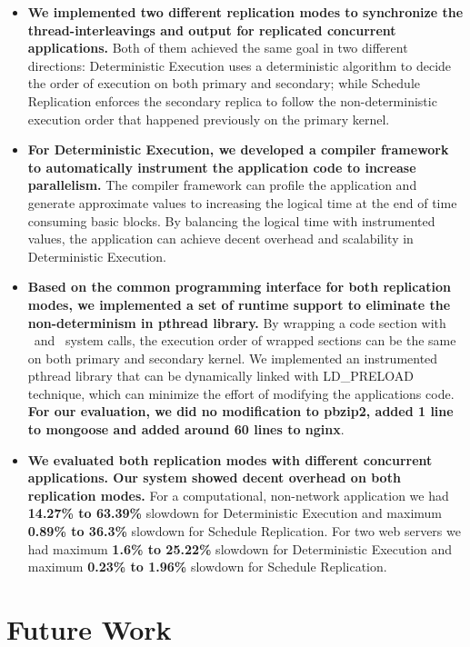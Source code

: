 \begin{itemize}
\item \textbf{We implemented two different replication modes to synchronize the thread-interleavings and output for replicated concurrent applications.} Both of them achieved the same goal in two different directions: Deterministic Execution uses a deterministic algorithm to decide the order of execution on both primary and secondary; while Schedule Replication enforces the secondary replica to follow the non-deterministic execution order that happened previously on the primary kernel.

\item \textbf{For Deterministic Execution, we developed a compiler framework to automatically instrument the application code to increase parallelism.} The compiler framework can profile the application and generate approximate values to increasing the logical time at the end of time consuming basic blocks. By balancing the logical time with instrumented values, the application can achieve decent overhead and scalability in Deterministic Execution.

\item \textbf{Based on the common programming interface for both replication modes, we implemented a set of runtime support to eliminate the non-determinism in pthread library.} By wrapping a code section with \detstart\ and \detend\ system calls, the execution order of wrapped sections can be the same on both primary and secondary kernel. We implemented an instrumented pthread library that can be dynamically linked with LD\_PRELOAD technique, which can minimize the effort of modifying the applications code. \textbf{For our evaluation, we did no modification to pbzip2, added 1 line to mongoose and added around 60 lines to nginx}.

\item \textbf{We evaluated both replication modes with different concurrent applications. Our system showed decent overhead on both replication modes.} For a computational, non-network application we had \textbf{14.27\% to 63.39\%} slowdown for Deterministic Execution and maximum \textbf{0.89\% to 36.3\%} slowdown for Schedule Replication. For two web servers we had maximum \textbf{1.6\% to 25.22\%} slowdown for Deterministic Execution and maximum \textbf{0.23\% to 1.96\%} slowdown for Schedule Replication.

\end{itemize}
\section{Future Work}
